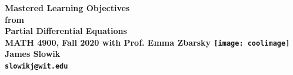 \documentclass{article}
\newtheorem{theorem}{Theorem}[section]
\begin{document}
\begin{titlepage}
  \begin{center}
    \bfseries
\huge Mastered Learning Objectives \\  from \\ Partial Differential Equations \\[.5in]
\large MATH 4900, Fall 2020 with Prof. Emma Zbarsky
\vfill
\texttt{[image: coolimage]}
\vfill
\LARGE James Slowik \\[.2in]
\texttt{slowikj@wit.edu}
\end{center}      
\end{titlepage}
\newpage
\tableofcontents
\newpage
\end{document}
